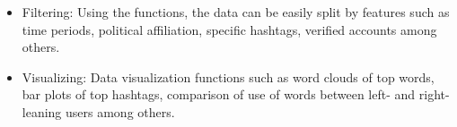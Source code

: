         \begin{itemize}
            \item 
            Filtering: Using the functions, the data can be easily split by features such as time periods, political affiliation, specific hashtags, verified accounts among others.
            
                
                
                
                
                
                
            
            \item 
            Visualizing: Data visualization functions such as word clouds of top words, bar plots of top hashtags, comparison of use of words between left- and right-leaning users among others.
            
                

\end{itemize}
